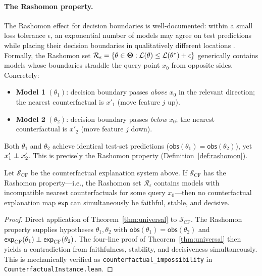 \paragraph{The Rashomon property.}
The Rashomon effect for decision boundaries is well-documented: within a small
loss tolerance $\epsilon$, an exponential number of models may agree on test
predictions while placing their decision boundaries in qualitatively different
locations \citep{semenova2022existence, fisher2019models}.  Formally, the
Rashomon set
$\mathcal{R}_\epsilon = \{\theta \in \mathbf{\Theta} : \mathcal{L}(\theta) \leq
\mathcal{L}(\theta^*) + \epsilon\}$
generically contains models whose boundaries straddle the query point $x_0$
from opposite sides.  Concretely:
\begin{itemize}
  \item \textbf{Model 1} $(\theta_1)$: decision boundary passes \emph{above}
    $x_0$ in the relevant direction; the nearest counterfactual is $x'_1$
    (move feature $j$ up).
  \item \textbf{Model 2} $(\theta_2)$: decision boundary passes \emph{below}
    $x_0$; the nearest counterfactual is $x'_2$ (move feature $j$ down).
\end{itemize}
Both $\theta_1$ and $\theta_2$ achieve identical test-set predictions
($\mathsf{obs}(\theta_1) = \mathsf{obs}(\theta_2)$), yet $x'_1 \perp x'_2$.
This is precisely the Rashomon property (Definition~\ref{def:rashomon}).

\begin{proposition}
\label{prop:counterfactual-impossibility}
Let $\mathcal{S}_{\mathrm{CF}}$ be the counterfactual explanation system above.
If $\mathcal{S}_{\mathrm{CF}}$ has the Rashomon property---i.e., the Rashomon
set $\mathcal{R}_\epsilon$ contains models with incompatible nearest
counterfactuals for some query $x_0$---then no counterfactual explanation map
$\mathsf{exp}$ can simultaneously be faithful, stable, and decisive.
\end{proposition}

\begin{proof}
Direct application of Theorem~\ref{thm:universal} to
$\mathcal{S}_{\mathrm{CF}}$.  The Rashomon property supplies hypotheses
$\theta_1, \theta_2$ with
$\mathsf{obs}(\theta_1) = \mathsf{obs}(\theta_2)$ and
$\mathsf{exp}_{\mathrm{CF}}(\theta_1) \perp
\mathsf{exp}_{\mathrm{CF}}(\theta_2)$.
The four-line proof of Theorem~\ref{thm:universal} then yields a
contradiction from faithfulness, stability, and decisiveness
simultaneously.  This is mechanically verified as
\texttt{counterfactual\_impossibility} in
\texttt{Counterfactual\-Instance.lean}.
\end{proof}

